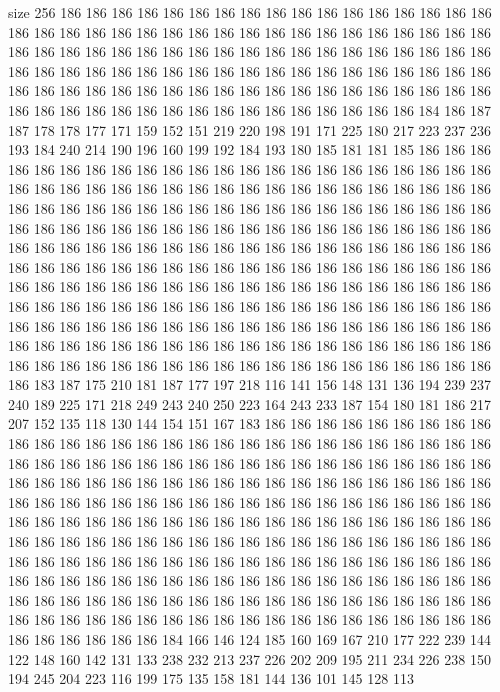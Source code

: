 size 256
186 186 186 186 186 186 186 186 186 186 186 186 186 186 186 186 186 186 186 186
186 186 186 186 186 186 186 186 186 186 186 186 186 186 186 186 186 186 186 186
186 186 186 186 186 186 186 186 186 186 186 186 186 186 186 186 186 186 186 186
186 186 186 186 186 186 186 186 186 186 186 186 186 186 186 186 186 186 186 186
186 186 186 186 186 186 186 186 186 186 186 186 186 186 186 186 186 186 186 186
186 186 186 186 186 186 186 186 186 184 186 187 187 178 178 177 171 159 152 151
219 220 198 191 171 225 180 217 223 237 236 193 184 240 214 190 196 160 199 192
184 193 180 185 181 181 185 186 186 186 186 186 186 186 186 186 186 186 186 186
186 186 186 186 186 186 186 186 186 186 186 186 186 186 186 186 186 186 186 186
186 186 186 186 186 186 186 186 186 186 186 186 186 186 186 186 186 186 186 186
186 186 186 186 186 186 186 186 186 186 186 186 186 186 186 186 186 186 186 186
186 186 186 186 186 186 186 186 186 186 186 186 186 186 186 186 186 186 186 186
186 186 186 186 186 186 186 186 186 186 186 186 186 186 186 186 186 186 186 186
186 186 186 186 186 186 186 186 186 186 186 186 186 186 186 186 186 186 186 186
186 186 186 186 186 186 186 186 186 186 186 186 186 186 186 186 186 186 186 186
186 186 186 186 186 186 186 186 186 186 186 186 186 186 186 186 186 186 186 186
186 186 186 186 186 186 186 186 186 186 186 186 186 186 186 186 186 186 186 186
186 186 186 186 186 186 186 186 186 186 186 186 186 186 186 186 186 186 186 186
183 187 175 210 181 187 177 197 218 116 141 156 148 131 136 194 239 237 240 189
225 171 218 249 243 240 250 223 164 243 233 187 154 180 181 186 217 207 152 135
118 130 144 154 151 167 183 186 186 186 186 186 186 186 186 186 186 186 186 186
186 186 186 186 186 186 186 186 186 186 186 186 186 186 186 186 186 186 186 186
186 186 186 186 186 186 186 186 186 186 186 186 186 186 186 186 186 186 186 186
186 186 186 186 186 186 186 186 186 186 186 186 186 186 186 186 186 186 186 186
186 186 186 186 186 186 186 186 186 186 186 186 186 186 186 186 186 186 186 186
186 186 186 186 186 186 186 186 186 186 186 186 186 186 186 186 186 186 186 186
186 186 186 186 186 186 186 186 186 186 186 186 186 186 186 186 186 186 186 186
186 186 186 186 186 186 186 186 186 186 186 186 186 186 186 186 186 186 186 186
186 186 186 186 186 186 186 186 186 186 186 186 186 186 186 186 186 186 186 186
186 186 186 186 186 186 186 186 186 186 186 186 186 186 186 186 186 186 186 186
186 186 186 186 186 186 186 186 186 186 186 186 184 166 146 124 185 160 169 167
210 177 222 239 144 122 148 160 142 131 133 238 232 213 237 226 202 209 195 211
234 226 238 150 194 245 204 223 116 199 175 135 158 181 144 136 101 145 128 113
